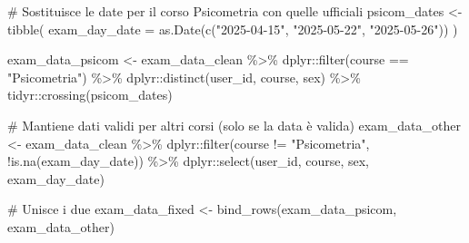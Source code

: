 \documentclass[
  11pt,
  a4paper,
  onecolumn]{article}
\newenvironment{Shaded}{}{}
\newcommand{\AttributeTok}[1]{\textcolor[rgb]{0.84,0.23,0.29}{#1}}
\newcommand{\CommentTok}[1]{\textcolor[rgb]{0.42,0.45,0.49}{#1}}
\newcommand{\FunctionTok}[1]{\textcolor[rgb]{0.44,0.26,0.76}{#1}}
\newcommand{\NormalTok}[1]{\textcolor[rgb]{0.14,0.16,0.18}{#1}}
\newcommand{\OtherTok}[1]{\textcolor[rgb]{0.44,0.26,0.76}{#1}}
\newcommand{\SpecialCharTok}[1]{\textcolor[rgb]{0.00,0.36,0.77}{#1}}
\newcommand{\StringTok}[1]{\textcolor[rgb]{0.01,0.18,0.38}{#1}}
\begin{document}
\begin{Shaded}
\begin{Highlighting}[]
\CommentTok{\# Sostituisce le date per il corso Psicometria con quelle ufficiali}
\NormalTok{psicom\_dates }\OtherTok{\textless{}{-}} \FunctionTok{tibble}\NormalTok{(}
  \AttributeTok{exam\_day\_date =} \FunctionTok{as.Date}\NormalTok{(}\FunctionTok{c}\NormalTok{(}\StringTok{"2025{-}04{-}15"}\NormalTok{, }\StringTok{"2025{-}05{-}22"}\NormalTok{, }\StringTok{"2025{-}05{-}26"}\NormalTok{))}
\NormalTok{)}
\end{Highlighting}
\end{Shaded}

\begin{Shaded}
\begin{Highlighting}[]
\NormalTok{exam\_data\_psicom }\OtherTok{\textless{}{-}}\NormalTok{ exam\_data\_clean }\SpecialCharTok{\%\textgreater{}\%}
\NormalTok{  dplyr}\SpecialCharTok{::}\FunctionTok{filter}\NormalTok{(course }\SpecialCharTok{==} \StringTok{"Psicometria"}\NormalTok{) }\SpecialCharTok{\%\textgreater{}\%}
\NormalTok{  dplyr}\SpecialCharTok{::}\FunctionTok{distinct}\NormalTok{(user\_id, course, sex) }\SpecialCharTok{\%\textgreater{}\%}
\NormalTok{  tidyr}\SpecialCharTok{::}\FunctionTok{crossing}\NormalTok{(psicom\_dates)}
\end{Highlighting}
\end{Shaded}

\begin{Shaded}
\begin{Highlighting}[]
\CommentTok{\# Mantiene dati validi per altri corsi (solo se la data è valida)}
\NormalTok{exam\_data\_other }\OtherTok{\textless{}{-}}\NormalTok{ exam\_data\_clean }\SpecialCharTok{\%\textgreater{}\%}
\NormalTok{  dplyr}\SpecialCharTok{::}\FunctionTok{filter}\NormalTok{(course }\SpecialCharTok{!=} \StringTok{"Psicometria"}\NormalTok{, }\SpecialCharTok{!}\FunctionTok{is.na}\NormalTok{(exam\_day\_date)) }\SpecialCharTok{\%\textgreater{}\%}
\NormalTok{  dplyr}\SpecialCharTok{::}\FunctionTok{select}\NormalTok{(user\_id, course, sex, exam\_day\_date)}
\end{Highlighting}
\end{Shaded}

\begin{Shaded}
\begin{Highlighting}[]
\CommentTok{\# Unisce i due}
\NormalTok{exam\_data\_fixed }\OtherTok{\textless{}{-}} \FunctionTok{bind\_rows}\NormalTok{(exam\_data\_psicom, exam\_data\_other)}
\end{Highlighting}
\end{Shaded}
\end{document}
